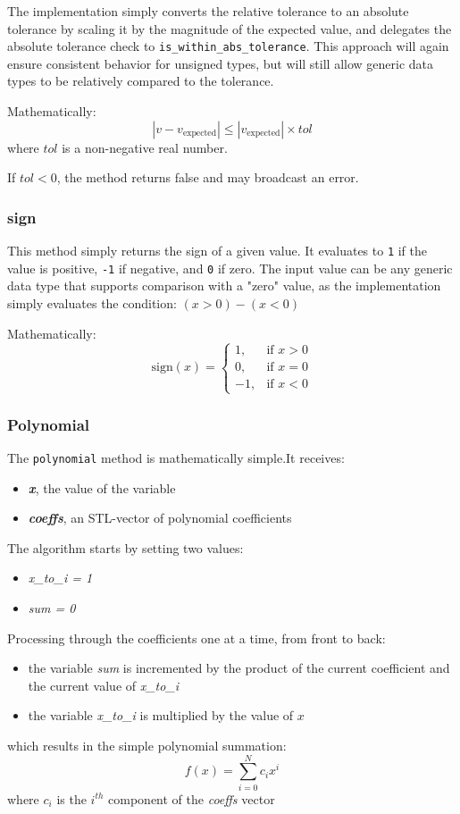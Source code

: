 \documentclass[11pt,fleqn]{report}
\begin{document}
The implementation simply converts the relative tolerance to 
an absolute tolerance by scaling it by the magnitude of the expected value, 
and delegates the absolute tolerance check to \texttt{is\_within\_abs\_tolerance}.
This approach will again ensure consistent behavior for unsigned types, but will 
still allow generic data types to be relatively compared to the tolerance.

Mathematically:
\[
|v - v_{\text{expected}}| \le |v_{\text{expected}}| \times tol
\]
where $tol$ is a non-negative real number.

If $tol < 0$, the method returns false and may broadcast an error. 

\subsubsection{sign}
This method simply returns the sign of a given value. It evaluates to
\texttt{1} if the value is positive, \texttt{-1} if negative, and \texttt{0} if
zero. The input value can be any generic data type that supports comparison with
a "zero" value, as the implementation simply evaluates the condition:
$(x > 0) - (x < 0)$

Mathematically:
\[
\text{sign}(x) =
\begin{cases}
1, & \text{if } x > 0 \\
0, & \text{if } x = 0 \\
 -1, & \text{if } x < 0
\end{cases}
\]

\subsubsection{Polynomial}
The \texttt{polynomial} method is mathematically simple.It receives:
\begin{itemize}
 \item \textit{\textbf{x}}, the value of the variable
 \item \textit{\textbf{coeffs}}, an STL-vector of polynomial coefficients
\end{itemize}
The algorithm starts by setting two values:
\begin{itemize}
 \item \textit{x\_to\_i = 1}
 \item\textit{sum = 0}
\end{itemize}
Processing through the coefficients one at a time, from front to back:
\begin{itemize}
 \item the variable \textit{sum} is incremented by the product of the
 current coefficient and the current value of \textit{x\_to\_i}
 \item the variable \textit{x\_to\_i} is multiplied by the value of $x$
\end{itemize}
which results in the simple polynomial summation:
\begin{equation}
 f(x) = \sum_{i=0}^{N} c_i x^i
\end{equation}
where $c_i$ is the $i^{th}$ component of the \textit{coeffs} vector
\end{document}
